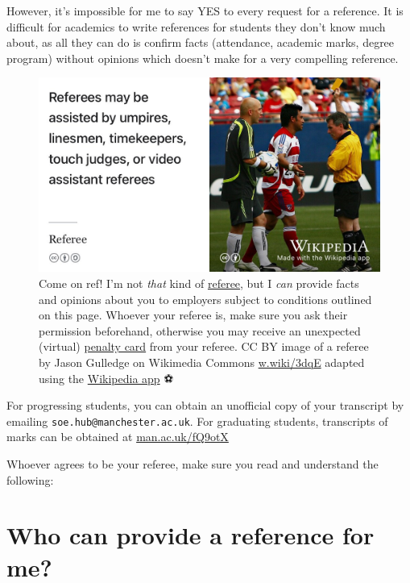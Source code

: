 \documentclass[
  12pt,
]{book}
\begin{document}
However, it's impossible for me to say YES to every request for a reference. It is difficult for academics to write references for students they don't know much about, as all they can do is confirm facts (attendance, academic marks, degree program) without opinions which doesn't make for a very compelling reference.

\begin{figure}

{\centering \includegraphics[width=0.99\linewidth]{images/referee} 

}

\caption{Come on ref! I'm not \emph{that} kind of \href{https://en.wikipedia.org/wiki/Referee}{referee}, but I \emph{can} provide facts and opinions about you to employers subject to conditions outlined on this page. Whoever your referee is, make sure you ask their permission beforehand, otherwise you may receive an unexpected (virtual) \href{https://en.wikipedia.org/wiki/Penalty_card}{penalty card} from your referee. CC BY image of a referee by Jason Gulledge on Wikimedia Commons \href{https://w.wiki/3dqE}{w.wiki/3dqE} adapted using the \href{https://apps.apple.com/us/app/wikipedia/id324715238}{Wikipedia app} ⚽️}\label{fig:referee-fig}
\end{figure}



For progressing students, you can obtain an unofficial copy of your transcript by emailing \texttt{soe.hub@manchester.ac.uk}. For graduating students, transcripts of marks can be obtained at \href{http://man.ac.uk/fQ9otX}{man.ac.uk/fQ9otX}

Whoever agrees to be your referee, make sure you read and understand the following:

\hypertarget{who-can-provide-a-reference-for-me}{%
\section{Who can provide a reference for me?}\label{who-can-provide-a-reference-for-me}}
\end{document}
